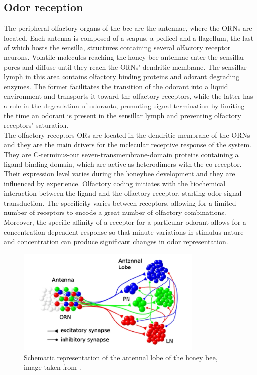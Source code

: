   \subsection{Odor reception}
  The peripheral olfactory organs of the bee are the antennae, where the ORNs are located.
  Each antenna is composed of a scapus, a pedicel and a flagellum, the last of which hosts the sensilla, structures containing several olfactory receptor neurons.
  Volatile molecules reaching the honey bee antennae enter the sensillar pores and diffuse until they reach the ORNs' dendritic membrane.
  The sensillar lymph in this area contains olfactory binding proteins and odorant degrading enzymes.
  The former facilitates the transition of the odorant into a liquid environment and transports it toward the olfactory receptors, while the latter has a role in the degradation of odorants, promoting signal termination by limiting the time an odorant is present in the sensillar lymph and preventing olfactory receptors' saturation.\\
  The olfactory receptors ORs are located in the dendritic membrane of the ORNs and they are the main drivers for the molecular receptive response of the system.
  They are C-terminus-out seven-transmembrane-domain proteins containing a ligand-binding domain, which are active as heterodimers with the co-receptor.
  Their expression level varies during the honeybee development and they are influenced by experience.
  Olfactory coding initiates with the biochemical interaction between the ligand and the olfactory receptor, starting odor signal transduction.
  The specificity varies between receptors, allowing for a limited number of receptors to encode a great number of olfactory combinations.
  Moreover, the specific affinity of a receptor for a particular odorant allows for a concentration-dependent response so that minute variations in stimulus nature and concentration can produce significant changes in odor representation.\\

  \begin{figure}
    \centering
    \includegraphics[width=0.8\textwidth]{antennal_lobe_organization}
    \caption{Schematic representation of the antennal lobe of the honey bee, image taken from \cite{bee-geosmin}.}
    \label{fig:antennal-lobe}
  \end{figure}

